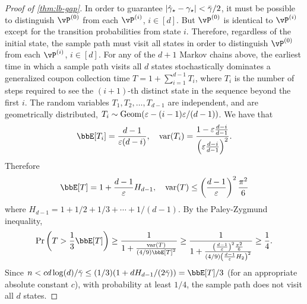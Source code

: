 \begin{proof}[Proof of \cref{thm:lb-gap}]
  In order to guarantee $|\hat\gamma_{\star} - \gamma_{\star}| < \bar\gamma/2$, it must
  be possible to distinguish $\vP^{(0)}$ from each $\vP^{(i)}$,
  $i\in[d]$.
  But $\vP^{(0)}$ is identical to $\vP^{(i)}$ except for the transition
  probabilities from state $i$.
  Therefore, regardless of the initial state, the sample path must
  visit all states in order to distinguish $\vP^{(0)}$ from each
  $\vP^{(i)}$, $i \in [d]$.
  For any of the $d+1$ Markov chains above, the earliest time in which
  a sample path visits all $d$ states
  stochastically dominates a generalized coupon collection time $T = 1 +
  \sum_{i=1}^{d-1} T_i$, where $T_i$ is the number of steps required to
  see the $(i+1)$-th distinct state in the sequence beyond the first
  $i$.
  The random variables $T_1,T_2,\dotsc,T_{d-1}$ are independent, and are
  geometrically distributed, $T_i \sim \operatorname{Geom}(\varepsilon -
  (i-1)\varepsilon/(d-1))$.
  We have that
  \[
    \bbE[T_i] = \frac{d-1}{\veps(d-i)} , \quad
    \var(T_i) = \frac{1 - \veps \frac{d-i}{d-1}}{%
      \Parens{ \veps \frac{d-i}{d-1} }^2
    }
    .
  \]
  Therefore
  \[
    \bbE[T] = 1 + \frac{d-1}{\veps} H_{d-1} , \quad
    \var(T) \leq \Parens{ \frac{d-1}{\veps} }^2 \frac{\pi^2}{6} 
  \]
  where $H_{d-1} = 1 + 1/2 + 1/3 + \dotsb + 1/(d-1)$.
  By the Paley-Zygmund inequality,
  \[
    \Pr\Parens{ T > \frac13\bbE[T] }
    \geq \frac{1}{1 + \frac{\var(T)}{(4/9)\bbE[T]^2}}
    \geq \frac{1}{1 + \frac{\Parens{ \frac{d-1}{\veps} }^2
    \frac{\pi^2}{6}}{(4/9)\Parens{ \frac{d-1}{\veps} H_2}^2}}
    \geq \frac14
    .
  \]
  Since $n < c d\log(d) / \bar\gamma \leq (1/3) (1 + d H_{d-1} /
  (2\bar\gamma)) = \bbE[T]/3$ (for an appropriate absolute constant
  $c$), with probability at least $1/4$, the sample path does not
  visit all $d$ states.
\end{proof}


